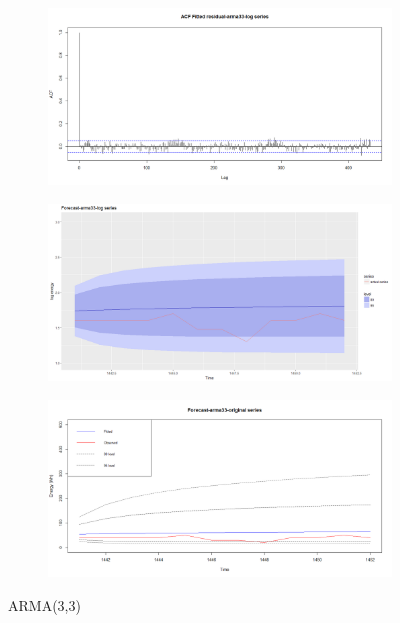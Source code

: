 \documentclass[12pt]{article}
\begin{document}
\begin{figure}[H]
\begin{subfigure}[b]{0.49\linewidth}
  \end{subfigure}
  \begin{subfigure}[b]{0.49\linewidth}
    \includegraphics[width=\linewidth]{figure16-4.png}
  \end{subfigure}
  \begin{subfigure}[b]{0.49\linewidth}
    \includegraphics[width=\linewidth]{figure16-5.png}
  \end{subfigure}
  \begin{subfigure}[b]{0.49\linewidth}
    \includegraphics[width=\linewidth]{figure16-6.png}
  \end{subfigure}
  \caption{ARMA(3,3)}
  \label{fig:figure17}
\end{figure}
\end{document}
